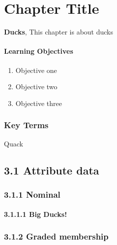 \documentclass[
]{book}
\providecommand{\tightlist}{%
  \setlength{\itemsep}{0pt}\setlength{\parskip}{0pt}}
\begin{document}
\hypertarget{types-of-data}{%
\chapter{Chapter Title}\label{types-of-data}}

\textbf{Ducks}, This chapter is about ducks

\hypertarget{learning-objectives-2}{%
\subsubsection*{Learning Objectives}\label{learning-objectives-2}}

\begin{enumerate}
\def\labelenumi{\arabic{enumi}.}
\tightlist
\item
  Objective one
\item
  Objective two
\item
  Objective three
\end{enumerate}

\hypertarget{key-terms-2}{%
\subsection*{Key Terms}\label{key-terms-2}}

Quack

\hypertarget{attribute-data}{%
\section{3.1 Attribute data}\label{attribute-data}}

\hypertarget{nominal}{%
\subsection{3.1.1 Nominal}\label{nominal}}

\hypertarget{big-ducks}{%
\subsubsection{3.1.1.1 Big Ducks!}\label{big-ducks}}

\hypertarget{graded-membership}{%
\subsection{3.1.2 Graded membership}\label{graded-membership}}
\end{document}
